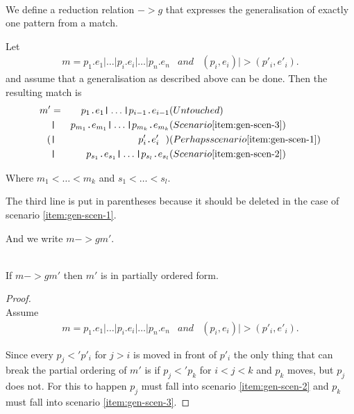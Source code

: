 \begin{definition}[Generalisation, $->g$]\ \\
\label{def:gener-match}
  We define a reduction relation $->g$ that expresses the
  generalisation of exactly one pattern from a match.

  Let
  \begin{eqnarray*}[rqTcql]
    m = p_1 \texttt{.} e_1 \texttt{|} \ldots \texttt{|} p_i \texttt{.} e_i
    \texttt{|} \ldots \texttt{|} p_n \texttt{.} e_n & and & (p_i, e_i) |> (p'_i,
    e'_i).
  \end{eqnarray*}
  and assume that a generalisation as described above can be done. Then the
  resulting match is
  \begin{eqnarray*}[rclqqqTl]
    m' &=& p_1 \texttt{.} e_1 \texttt{|} \ldots \texttt{|} p_{i-1} \texttt{.}
    e_{i-1} & (Untouched)\label{eq:gen-1}\\
    &\texttt{|}& p_{m_1} \texttt{.} e_{m_1} \texttt{|} \ldots \texttt{|} p_{m_k}
    \texttt{.} e_{m_k} & (Scenario \ref{item:gen-scen-3})\label{eq:gen-2}\\
    (&\texttt{|}& p'_i \texttt{.} e'_i \ \ ) 
    & (Perhaps scenario \ref{item:gen-scen-1})\label{eq:gen-3}\\
    &\texttt{|}& p_{s_1} \texttt{.} e_{s_1} \texttt{|} \ldots \texttt{|} p_{s_l}
    \texttt{.} e_{s_l} & (Scenario \ref{item:gen-scen-2})\label{eq:gen-4}
  \end{eqnarray*}

  Where $m_1 < \ldots < m_k$ and $s_1 < \ldots < s_l$.

  The third line is put in parentheses because it should be deleted in the case
  of scenario \ref{item:gen-scen-1}.

  And we write $m ->g m'$.

  \begin{lemma}\ \\
    If $m ->g m'$ then $m'$ is in partially ordered form.
  \end{lemma}
  \begin{proof}\ \\
    Assume
    \begin{eqnarray*}[rqTcql]
      m = p_1 \texttt{.} e_1 \texttt{|} \ldots \texttt{|} p_i \texttt{.} e_i
      \texttt{|} \ldots \texttt{|} p_n \texttt{.} e_n & and & (p_i, e_i) |> (p'_i,
      e'_i).
    \end{eqnarray*}

    Since every $p_j <' p'_i$ for $j > i$ is moved in front of $p'_i$ the only
    thing that can break the partial ordering of $m'$ is if $p_j <' p_k$ for
    $i < j < k$ and $p_k$ moves, but $p_j$ does not. For this to happen $p_j$
    must fall into scenario \ref{item:gen-scen-2} and $p_k$ must fall into
    scenario \ref{item:gen-scen-3}.


\end{proof}
\end{definition}

